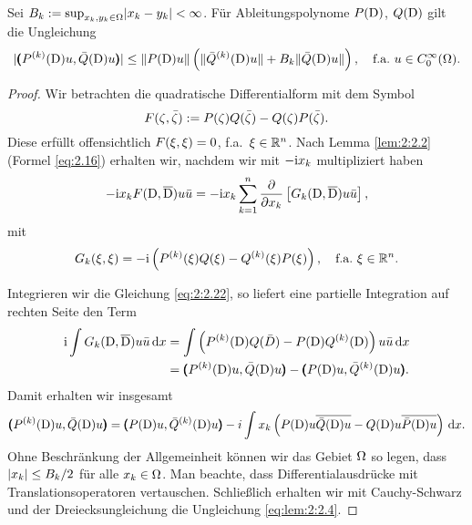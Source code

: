 \begin{lem}
Sei $B_k:=\sup_{x_k,y_k\in\Omega}\lvert x_k-y_k\rvert<\infty$.
Für Ableitungspolynome $P(\mathrm D)$, $Q(\mathrm D)$ gilt die Ungleichung
\begin{equation}\label{eq:lem:2:2.4}
\lvert\pmb(P^{(k)}(\mathrm D)u,\bar{Q}(\mathrm D)u\pmb)\rvert\leq\lVert P(\mathrm D)u\rVert\left(\lVert\bar{Q}^{(k)}(\mathrm D)u\rVert+B_k\lVert\bar{Q}(\mathrm D)u\rVert\right),
\quad\text{f.a.}~u\in C^\infty_0(\Omega).
\end{equation}
\end{lem}

\begin{proof}
Wir betrachten die quadratische Differentialform mit dem Symbol
\begin{equation}
F(\zeta,\bar{\zeta}):=P(\zeta)Q(\bar{\zeta})-Q(\zeta)P(\bar{\zeta}).
\end{equation}
Diese erfüllt offensichtlich $F(\xi,\xi)=0$, f.a.~$\xi\in\mathbb R^n$.
Nach Lemma \ref{lem:2:2.2} (Formel \eqref{eq:2.16})
erhalten wir, nachdem wir mit $-\mathrm i x_k$ multipliziert haben
\begin{equation}\label{eq:2:2.22}
-\mathrm i x_kF(\mathrm D,\overline{\mathrm D})u\bar{u}=-\mathrm i x_k\sum_{k=1}^n\frac{\partial}{\partial x_k}\left[G_k(\mathrm D,\overline{\mathrm D})u\bar{u}\right],
\end{equation}
mit
\begin{equation}
G_k(\xi,\xi)=-\mathrm i\left(P^{(k)}(\xi)Q(\xi)-Q^{(k)}(\xi)P(\xi)\right),
\quad\text{f.a.}~\xi\in\mathbb R^n.
\end{equation}

Integrieren wir die Gleichung \eqref{eq:2:2.22},
so liefert eine partielle Integration auf rechten Seite den Term
\begin{align}
\mathrm i\int G_k(\mathrm D,\overline{\mathrm D})u\bar{u}\,\mathrm d x&=\int\left(P^{(k)}(\mathrm D)Q(\bar{D})-P(\mathrm D)Q^{(k)}(\mathrm D)\right)u\bar{u}\,\mathrm d x\\
&=\pmb(P^{(k)}(\mathrm D)u,\bar{Q}(\mathrm D)u\pmb)-\pmb(P(\mathrm D)u,\bar{Q}^{(k)}(\mathrm D)u\pmb).
\end{align}
Damit erhalten wir insgesamt
\begin{equation}
\pmb(P^{(k)}(\mathrm D)u,\bar{Q}(\mathrm D)u\pmb)
=\pmb(P(\mathrm D)u,\bar{Q}^{(k)}(\mathrm D)u\pmb)-i\int x_k\left(P(\mathrm D)u\overline{\bar{Q}(\mathrm D)u}-Q(\mathrm D)u\overline{\bar{P}(\mathrm D)u}\right)\,\mathrm d x.
\end{equation}
Ohne Beschränkung der Allgemeinheit können wir das Gebiet $\Omega$ so legen,
dass $\lvert x_k\rvert\leq B_k/2$ für alle $x_k\in\Omega$.
Man beachte, dass Differentialausdrücke mit Translationsoperatoren vertauschen.
Schließlich erhalten wir mit Cauchy-Schwarz
und der Dreiecksungleichung die Ungleichung \eqref{eq:lem:2:2.4}.
\end{proof}

